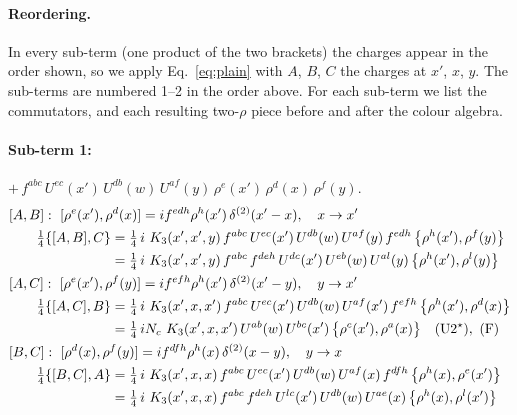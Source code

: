 \documentclass[10pt]{article}
\numberwithin{equation}{section}
\begin{document}
\paragraph{Reordering.} In every sub-term (one product of the two brackets) the charges appear in the order shown, so we apply Eq.~\eqref{eq:plain} with $A$, $B$, $C$ the charges at $x'$, $x$, $y$. The sub-terms are numbered 1--2 in the order above. For each sub-term we list the commutators, and each resulting two-$\rho$ piece before and after the colour algebra.
\paragraph{Sub-term 1:} $+\,f^{abc}\,U^{ec}(x')\,U^{db}(w)\,U^{af}(y)\,\rho^{e}(x')\,\rho^{d}(x)\,\rho^{f}(y)$.
\begin{align}
&[A,B]:\ [\rho^{e}(x'),\rho^{d}(x)]=i f^{edh}\rho^{h}(x')\,\delta^{(2)}(x'-x),\quad x\to x'\notag\\
&\qquad \tfrac14\{[A,B],C\}=\tfrac14\,i\,\,K_3(x',x',y)\,f^{abc}\,U^{ec}(x')\,U^{db}(w)\,U^{af}(y)\,f^{edh}\,\big\{\rho^{h}(x'),\rho^{f}(y)\big\}\notag\\
&\qquad\phantom{\tfrac14\{[A,B],C\}}=\tfrac14\,i\,\,K_3(x',x',y)\,f^{abc}\,f^{deh}\,U^{dc}(x')\,U^{eb}(w)\,U^{al}(y)\,\big\{\rho^{h}(x'),\rho^{l}(y)\big\}
\label{eq:B2-1-AB}\\
&[A,C]:\ [\rho^{e}(x'),\rho^{f}(y)]=i f^{efh}\rho^{h}(x')\,\delta^{(2)}(x'-y),\quad y\to x'\notag\\
&\qquad \tfrac14\{[A,C],B\}=\tfrac14\,i\,\,K_3(x',x,x')\,f^{abc}\,U^{ec}(x')\,U^{db}(w)\,U^{af}(x')\,f^{efh}\,\big\{\rho^{h}(x'),\rho^{d}(x)\big\}\notag\\
&\qquad\phantom{\tfrac14\{[A,C],B\}}=\tfrac14\,i N_{c}\,\,K_3(x',x,x')\,U^{ab}(w)\,U^{bc}(x')\,\big\{\rho^{c}(x'),\rho^{a}(x)\big\}\quad\text{(U2$^\star$)},\ \text{(F)}
\label{eq:B2-1-AC}\\
&[B,C]:\ [\rho^{d}(x),\rho^{f}(y)]=i f^{dfh}\rho^{h}(x)\,\delta^{(2)}(x-y),\quad y\to x\notag\\
&\qquad \tfrac14\{[B,C],A\}=\tfrac14\,i\,\,K_3(x',x,x)\,f^{abc}\,U^{ec}(x')\,U^{db}(w)\,U^{af}(x)\,f^{dfh}\,\big\{\rho^{h}(x),\rho^{e}(x')\big\}\notag\\
&\qquad\phantom{\tfrac14\{[B,C],A\}}=\tfrac14\,i\,\,K_3(x',x,x)\,f^{abc}\,f^{deh}\,U^{lc}(x')\,U^{db}(w)\,U^{ae}(x)\,\big\{\rho^{h}(x),\rho^{l}(x')\big\}
\label{eq:B2-1-BC}
\end{align}
\end{document}
